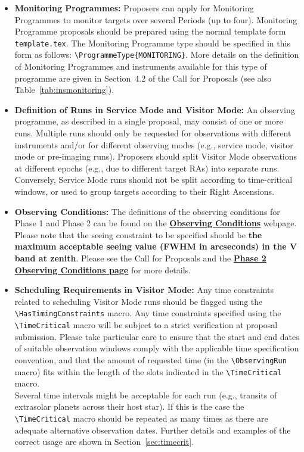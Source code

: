 \documentclass{article}
\begin{document}
\begin{itemize}
\item{\bf Monitoring Programmes:}  
Proposers can apply for Monitoring Programmes to monitor targets over several Periods (up to four).  
Monitoring Programme proposals should be prepared using the normal template form \verb|template.tex|. The Monitoring Programme type should be specified in this form as follows: \linebreak\verb|\ProgrammeType{MONITORING}|. More details on the definition of Monitoring Programmes and instruments available for this type of programme are given in Section~4.2 of the Call for Proposals (see also Table~\ref{tab:insmonitoring}).

\item{\bf Definition of Runs in Service Mode and Visitor Mode:}
An observing programme, as described in a single proposal, may consist of one or more runs. Multiple runs should only be requested for observations with different instruments and/or for different observing modes (e.g., service mode, visitor mode or pre-imaging runs). Proposers should split Visitor Mode observations at different epochs (e.g., due to different target RAs) into separate runs. Conversely, Service Mode runs should not be split according to time-critical windows, or used to group targets according to their Right Ascensions.

\item{\bf Observing Conditions:} The definitions of the observing conditions for Phase 1 and Phase 2 can be found on the  \href{http://www.eso.org/sci/observing/phase2/ObsConditions.html}{\bf \underline{Observing Conditions}} webpage. Please note that the seeing constraint to be specified should be 
{\bf the maximum acceptable seeing value (FWHM in arcseconds) in the V band at zenith}.
Please see the Call for Proposals and the 
\href{http://www.eso.org/sci/observing/phase2/ObsConditions.html}{\bf\underline{Phase 2 Observing Conditions page}}
for more details.

\item{\bf Scheduling Requirements in Visitor Mode:}
Any time constraints related to scheduling Visitor Mode runs should be flagged
using the \verb|\HasTimingConstraints| macro.
Any time constraints specified using the \verb|\TimeCritical| macro 
will be subject to a strict verification  at proposal submission. Please take
particular care to ensure
that the start and end dates of suitable observation windows comply
with the applicable time specification convention, and that the
amount of requested time (in the \verb|\ObservingRun| macro) fits
within the length of the slots indicated in the
\verb|\TimeCritical| macro.  \\
Several time intervals might be acceptable for each run 
(e.g., transits of extrasolar planets
across their host star). If this is the case the \verb|\TimeCritical| macro should be 
repeated as many   times as there are adequate alternative observation dates.
Further details and examples of the
correct usage are shown in Section~\ref{sec:timecrit}. 


\end{itemize}
\end{document}
